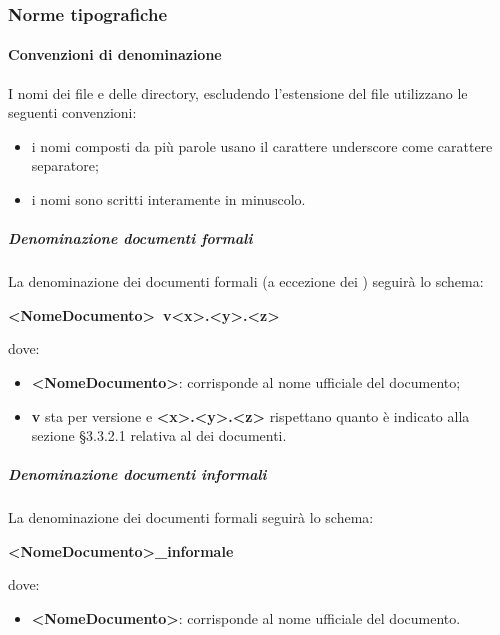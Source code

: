         \subsubsection{Norme tipografiche}
            \paragraph{Convenzioni di denominazione}
                I nomi dei file e delle directory, escludendo l’estensione del file utilizzano le seguenti convenzioni:\\
                \begin{itemize}
                    \item i nomi composti da più parole usano il carattere underscore come carattere separatore;
                    \item i nomi sono scritti interamente in minuscolo.
                \end{itemize}
                \subparagraph{Denominazione documenti formali}
                    La denominazione dei documenti formali (a eccezione dei ) seguirà lo schema:  \\
                    \begin{center}
                        \textbf{<NomeDocumento>\ v<x>.<y>.<z>}
                    \end{center}
                    dove: \\
                    \begin{itemize}
                        \item\textbf{<NomeDocumento>}: corrisponde al nome ufficiale del documento; 
                        \item\textbf{v} sta per versione e \textbf{<x>.<y>.<z>} rispettano quanto è indicato alla sezione §3.3.2.1 relativa al  dei documenti.
                    \end{itemize}
                \subparagraph{Denominazione documenti informali}
                    La denominazione dei documenti formali seguirà lo schema:  \\
                    \begin{center}
                        \textbf{<NomeDocumento>\_informale}
                    \end{center}
                    dove: \\
                    \begin{itemize}
                        \item\textbf{<NomeDocumento>}: corrisponde al nome ufficiale del documento.
                    \end{itemize}
